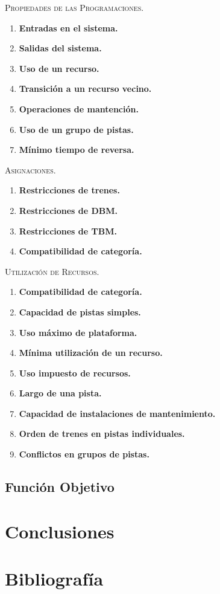 \documentclass[letter, 10pt]{article}
\begin{document}
\begin{description}
	\item \textsc{Propiedades de las Programaciones.}
	\begin{enumerate}
		\item \textbf{Entradas en el sistema.}
		\item \textbf{Salidas del sistema.}
		\item \textbf{Uso de un recurso.}
		\item \textbf{Transición a un recurso vecino.}
		\item \textbf{Operaciones de mantención.}
		\item \textbf{Uso de un grupo de pistas.}
		\item \textbf{Mínimo tiempo de reversa.}
	\end{enumerate}

	\item \textsc{Asignaciones.}
	\begin{enumerate}
		\item \textbf{Restricciones de trenes.}
		\item \textbf{Restricciones de DBM.}
		\item \textbf{Restricciones de TBM.}
		\item \textbf{Compatibilidad de categoría.}
	\end{enumerate}

	\item \textsc{Utilización de Recursos.}
	\begin{enumerate}
		\item \textbf{Compatibilidad de categoría.}
		\item \textbf{Capacidad de pistas simples.}
		\item \textbf{Uso máximo de plataforma.}
		\item \textbf{Mínima utilización de un recurso.}
		\item \textbf{Uso impuesto de recursos.}
		\item \textbf{Largo de una pista.}
		\item \textbf{Capacidad de instalaciones de mantenimiento.}
		\item \textbf{Orden de trenes en pistas individuales.}
		\item \textbf{Conflictos en grupos de pistas.}
	\end{enumerate}

\end{description}

\subsection{Función Objetivo}


\section{Conclusiones} \label{conclutions}


\section{Bibliografía}



\end{document}
